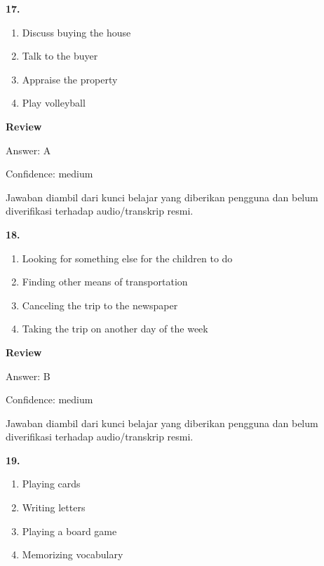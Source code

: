 \documentclass[12pt]{article}
\begin{document}
\endgroup
\par
\vspace{0.25\baselineskip}
\noindent\textbf{17.}
\begin{enumerate}[label=(\Alph*),leftmargin=*,itemsep=0.2em]
\item Discuss buying the house
\item Talk to the buyer
\item Appraise the property
\item Play volleyball
\end{enumerate}
\par
\begingroup
\setlength{\parskip}{0pt}
\setlength{\parindent}{0pt}
\textbf{Review}\par
Answer: A\par
Confidence: medium\par
Jawaban diambil dari kunci belajar yang diberikan pengguna dan belum diverifikasi terhadap audio/transkrip resmi.\par
\endgroup
\par
\vspace{0.25\baselineskip}
\noindent\textbf{18.}
\begin{enumerate}[label=(\Alph*),leftmargin=*,itemsep=0.2em]
\item Looking for something else for the children to do
\item Finding other means of transportation
\item Canceling the trip to the newspaper
\item Taking the trip on another day of the week
\end{enumerate}
\par
\begingroup
\setlength{\parskip}{0pt}
\setlength{\parindent}{0pt}
\textbf{Review}\par
Answer: B\par
Confidence: medium\par
Jawaban diambil dari kunci belajar yang diberikan pengguna dan belum diverifikasi terhadap audio/transkrip resmi.\par
\endgroup
\par
\vspace{0.25\baselineskip}
\noindent\textbf{19.}
\begin{enumerate}[label=(\Alph*),leftmargin=*,itemsep=0.2em]
\item Playing cards
\item Writing letters
\item Playing a board game
\item Memorizing vocabulary
\end{enumerate}
\end{document}
